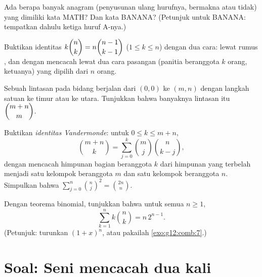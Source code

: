 \begin{exercise}[$\star\star$]\label{exo:g12:comb:6}
Ada berapa banyak anagram (penyusunan ulang hurufnya, bermakna atau tidak) yang
dimiliki kata MATH? Dan kata BANANA?
(Petunjuk untuk BANANA: tempatkan dahulu ketiga huruf A-nya.)
\end{exercise}

\begin{exercise}[$\star\star$]\label{exo:g12:comb:7}
Buktikan identitas $k\dbinom{n}{k} = n\dbinom{n-1}{k-1}$ ($1 \leq k \leq n$)
dengan dua cara: lewat rumus , dan dengan mencacah lewat dua cara
pasangan (panitia beranggota $k$ orang, ketuanya) yang dipilih dari $n$ orang.
\end{exercise}

\begin{exercise}[$\star\star$]\label{exo:g12:comb:8}
Sebuah lintasan pada bidang berjalan dari $(0,0)$ ke $(m, n)$ dengan langkah
satuan ke timur atau ke utara. Tunjukkan bahwa banyaknya lintasan itu $\dbinom{m+n}{m}$.
\end{exercise}

\begin{exercise}[$\star\star\star$]\label{exo:g12:comb:9}
Buktikan \emph{identitas Vandermonde}: untuk $0 \leq k \leq m + n$,
\[
\binom{m+n}{k} = \sum_{j=0}^{k} \binom{m}{j}\binom{n}{k-j},
\]
dengan mencacah himpunan bagian beranggota $k$ dari himpunan yang terbelah menjadi
satu kelompok beranggota $m$ dan satu kelompok beranggota $n$. Simpulkan bahwa
$\displaystyle\sum_{j=0}^{n}\binom{n}{j}^{\!2} = \binom{2n}{n}$.
\end{exercise}

\begin{exercise}[$\star\star\star$]\label{exo:g12:comb:10}
Dengan teorema binomial, tunjukkan bahwa untuk semua $n \geq 1$,
\[
\sum_{k=1}^{n} k \binom{n}{k} = n\,2^{n-1}.
\]
(Petunjuk: turunkan $(1+x)^n$, atau pakailah \cref{exo:g12:comb:7}.)
\end{exercise}

\section{Soal: Seni mencacah dua kali}

